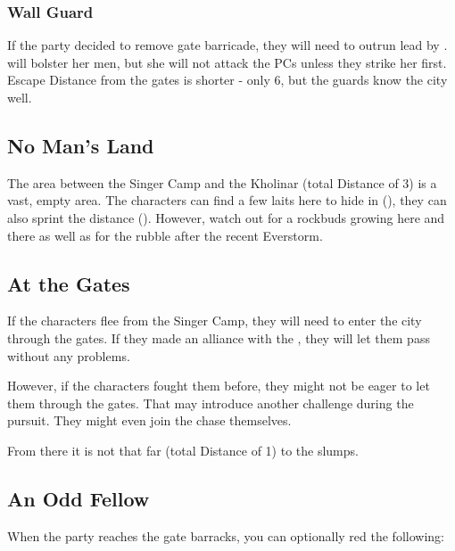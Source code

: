 \subsubsection{Wall Guard}

If the party decided to remove gate barricade, they will need to outrun \enemyWallGuard{} lead by \enemyWallGuardHighmarshal{}. \npcHighmarshal{} will bolster her men, but she will not attack the PCs unless they strike her first. Escape Distance from the gates is shorter - only 6, but the guards know the city well.



\subsection{No Man's Land}

The area between the Singer Camp and the Kholinar (total Distance of 3) is a vast, empty area. The characters can find a few laits here to hide in (\skillStealth{}), they can also sprint the distance (\skillAthletics{}). However, watch out for a rockbuds growing here and there as well as for the rubble after the recent Everstorm.



\subsection{At the Gates}

If the characters flee from the Singer Camp, they will need to enter the city through the gates. If they made an alliance with the \npcFractionWall{}, they will let them pass without any problems.

However, if the characters fought them before, they might not be eager to let them through the gates. That may introduce another challenge during the pursuit. They might even join the chase themselves.

From there it is not that far (total Distance of 1) to the slumps.


\subsection{An Odd Fellow}

When the party reaches the gate barracks, you can optionally red the following:


